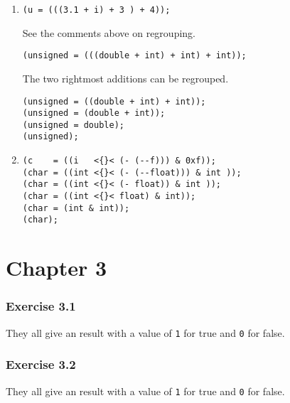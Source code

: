 \begin{enumerate}
    

    \item 
     \begin{Verbatim}
(u = (((3.1 + i) + 3 ) + 4));
\end{Verbatim}

     See the comments above on regrouping.


     \begin{Verbatim}
(unsigned = (((double + int) + int) + int));
\end{Verbatim}

     The two rightmost additions can be regrouped.


     \begin{Verbatim}
(unsigned = ((double + int) + int));
(unsigned = (double + int));
(unsigned = double);
(unsigned);
\end{Verbatim}

    

    \item 
     \begin{Verbatim}
(c    = ((i   <{}< (- (--f))) & 0xf));
(char = ((int <{}< (- (--float))) & int ));
(char = ((int <{}< (- float)) & int ));
(char = ((int <{}< float) & int));
(char = (int & int));
(char);
\end{Verbatim}

    

   \end{enumerate}

  

 
        \section*{Chapter 3}
        

  

  \subsubsection*{Exercise 3.1}

   They all give an \kint{} result with a value of \texttt{1}
    for true and \texttt{0} for false.


  

  \subsubsection*{Exercise 3.2}

   They all give an \kint{} result with a value of \texttt{1}
    for true and \texttt{0} for false.



